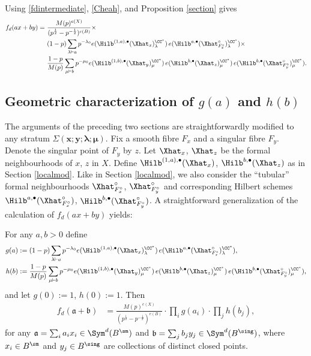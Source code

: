 Using \eqref{fdintermediate}, \eqref{Cheah}, and Proposition \ref{section} gives
\begin{align*}
f_d(ax+by) = \ &\frac{M(p)^{e(X)}}{(p^{\frac{1}{2}}-p^{-\frac{1}{2}})^{e(B)}} \times \\
&(1-p) \sum_{\lambda \vdash a} p^{-\lambda_0} e(\Hilb^{(1,a),\bullet}(\Xhat _x)_{\lambda}^{\CC^*}) \, e(\Hilb^{a,\bullet}(\Xhat ^{\circ}_{F_{x}^{\circ}})_{\lambda}^{\CC^*}) \times \\
&\frac{1-p}{M(p)} \sum_{\mu \vdash b} p^{-\mu_0} e(\Hilb^{(1,b),\bullet}(\Xhat _y)_{\mu}^{\CC^*}) \, e(\Hilb^{b,\bullet}(\Xhat _z)_{\mu}^{\CC^*}) \, e(\Hilb^{b,\bullet}(\Xhat ^{\circ}_{F_{y}^{\circ}})_{\mu}^{\CC^*}).
\end{align*}

   
\subsection{Geometric characterization of $g(a)$ and $h(b)$} \label{chargh}

The arguments of the preceding two sections are straightforwardly modified to any stratum $\Sigma(\boldsymbol{x};\boldsymbol{y};\boldsymbol{\lambda};\boldsymbol{\mu})$. Fix a smooth fibre $F_x$ and a singular fibre $F_y$. Denote the singular point of $F_y$ by $z$. Let $\Xhat _x$, $\Xhat _z$ be the formal neighbourhoods of $x$, $z$ in $X$. Define $\Hilb^{(1,a),\bullet}(\Xhat _x)$, $\Hilb^{b,\bullet}(\Xhat _z)$ as in Section \ref{localmod}. Like in Section \ref{localmod}, we also consider the ``tubular'' formal neighbourhoods $\Xhat ^{\circ}_{F_{x}^{\circ}}$, $\Xhat ^{\circ}_{F_{y}^{\circ}}$ and corresponding Hilbert schemes $\Hilb^{a,\bullet}(\Xhat ^{\circ}_{F_{x}^{\circ}})$, $\Hilb^{b,\bullet}(\Xhat ^{\circ}_{F_{y}^{\circ}})$. A straightforward generalization of the calculation of $f_d(ax+by) $ yields:
\begin{proposition} \label{geomgh}
For any $a,b>0$ define
\begin{align*}
g(a) &:= (1-p) \sum_{\lambda \vdash a} p^{-\lambda_0} e(\Hilb^{(1,a),\bullet}(\Xhat _x)_{\lambda}^{\CC^*}) \, e(\Hilb^{a,\bullet}(\Xhat ^{\circ}_{F_{x}^{\circ}})_{\lambda}^{\CC^*}), \\
h(b) &:= \frac{1-p}{M(p)} \sum_{\mu \vdash b} p^{-\mu_0} e(\Hilb^{(1,b),\bullet}(\Xhat _y)_{\mu}^{\CC^*}) \, e(\Hilb^{b,\bullet}(\Xhat _z)_{\mu}^{\CC^*}) \, e(\Hilb^{b,\bullet}(\Xhat ^{\circ}_{F_{y}^{\circ}})_{\mu}^{\CC^*}),
\end{align*}
and let $g(0) := 1$, $h(0) :=1$. Then
\begin{align*}
f_{d}(\mathfrak{a} + \mathfrak{b}) &= \frac{M(p)^{e(X)}}{(p^{\frac{1}{2}}-p^{-\frac{1}{2}})^{e(B)}} \cdot \prod_{i} g(a_i) \cdot \prod_{j} h(b_j), 
\end{align*}
for any $\mathfrak{a} = \sum_i a_i x_i \in \Sym^{d}(B^{\sm})$ and $\mathfrak{b} = \sum_j b_j y_j \in \Sym^{d}(B^{\sing})$, where $x_i \in B^{\sm}$ and $y_j \in B^{\sing}$ are collections of distinct closed points.
\end{proposition}
   
